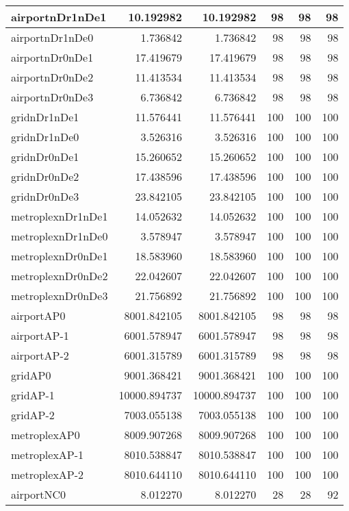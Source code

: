 \begin{longtable}{|l|r|r|r|r|r|}
\endlastfoot
airportnDr1nDe1 & 10.192982 & 10.192982 & 98 & 98 & 98 \\ \hline
airportnDr1nDe0 & 1.736842 & 1.736842 & 98 & 98 & 98 \\ \hline
airportnDr0nDe1 & 17.419679 & 17.419679 & 98 & 98 & 98 \\ \hline
airportnDr0nDe2 & 11.413534 & 11.413534 & 98 & 98 & 98 \\ \hline
airportnDr0nDe3 & 6.736842 & 6.736842 & 98 & 98 & 98 \\ \hline
gridnDr1nDe1 & 11.576441 & 11.576441 & 100 & 100 & 100 \\ \hline
gridnDr1nDe0 & 3.526316 & 3.526316 & 100 & 100 & 100 \\ \hline
gridnDr0nDe1 & 15.260652 & 15.260652 & 100 & 100 & 100 \\ \hline
gridnDr0nDe2 & 17.438596 & 17.438596 & 100 & 100 & 100 \\ \hline
gridnDr0nDe3 & 23.842105 & 23.842105 & 100 & 100 & 100 \\ \hline
metroplexnDr1nDe1 & 14.052632 & 14.052632 & 100 & 100 & 100 \\ \hline
metroplexnDr1nDe0 & 3.578947 & 3.578947 & 100 & 100 & 100 \\ \hline
metroplexnDr0nDe1 & 18.583960 & 18.583960 & 100 & 100 & 100 \\ \hline
metroplexnDr0nDe2 & 22.042607 & 22.042607 & 100 & 100 & 100 \\ \hline
metroplexnDr0nDe3 & 21.756892 & 21.756892 & 100 & 100 & 100 \\ \hline
airportAP0 & 8001.842105 & 8001.842105 & 98 & 98 & 98 \\ \hline
airportAP-1 & 6001.578947 & 6001.578947 & 98 & 98 & 98 \\ \hline
airportAP-2 & 6001.315789 & 6001.315789 & 98 & 98 & 98 \\ \hline
gridAP0 & 9001.368421 & 9001.368421 & 100 & 100 & 100 \\ \hline
gridAP-1 & 10000.894737 & 10000.894737 & 100 & 100 & 100 \\ \hline
gridAP-2 & 7003.055138 & 7003.055138 & 100 & 100 & 100 \\ \hline
metroplexAP0 & 8009.907268 & 8009.907268 & 100 & 100 & 100 \\ \hline
metroplexAP-1 & 8010.538847 & 8010.538847 & 100 & 100 & 100 \\ \hline
metroplexAP-2 & 8010.644110 & 8010.644110 & 100 & 100 & 100 \\ \hline
airportNC0 & 8.012270 & 8.012270 & 28 & 28 & 92 \\ \hline

\end{longtable}
